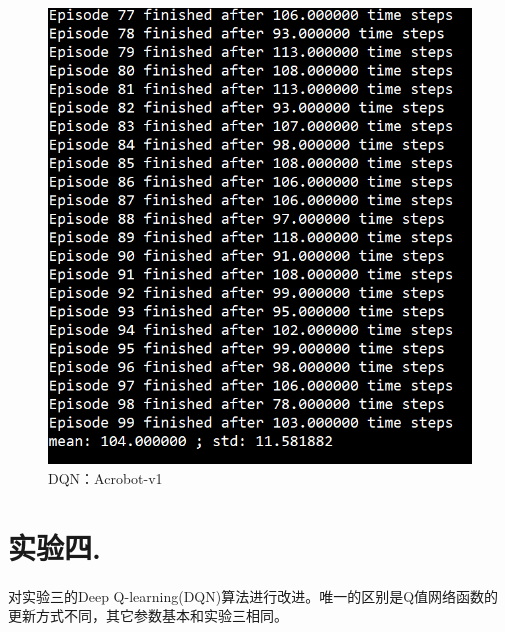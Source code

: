 \documentclass[a4paper,UTF8]{article}
\theoremstyle{definition}
\begin{document}
    \begin{center}
    \begin{figure}[H]
          \centering
          \includegraphics[width=12cm]{21.png}
          \caption{DQN：Acrobot-v1}
          \label{fig:2.3}
    \end{figure}
    \end{center}
    
	
\section{实验四. }
	\paragraph*{}
	对实验三的Deep Q-learning(DQN)算法进行改进。唯一的区别是Q值网络函数的更新方式不同，其它参数基本和实验三相同。
\end{document}
